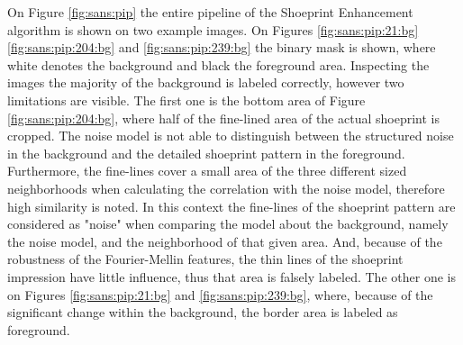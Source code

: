 \documentclass[draft,final]{vutinfth} %
\begin{document}
\par
On Figure \ref{fig:sans:pip} the entire pipeline of the Shoeprint Enhancement algorithm is shown on two example images.
On Figures  \ref{fig:sans:pip:21:bg} \ref{fig:sans:pip:204:bg} and \ref{fig:sans:pip:239:bg} the binary mask is shown, where white denotes the background and black the foreground area.
Inspecting the images the majority of the background is labeled correctly, however two limitations are visible.
The first one is the bottom area of Figure \ref{fig:sans:pip:204:bg}, where half of the fine-lined area of the actual shoeprint is cropped.
The noise model is not able to distinguish between the structured noise in the background and the detailed shoeprint pattern in the foreground.
Furthermore, the fine-lines cover a small area of the three different sized neighborhoods when calculating the correlation with the noise model, therefore high similarity is noted.
In this context the fine-lines of the shoeprint pattern are considered as "noise" when comparing the model about the background, namely the noise model, and the neighborhood of that given area.
And, because of the robustness of the Fourier-Mellin features, the thin lines of the shoeprint impression have little influence, thus that area is falsely labeled.
The other one is on Figures \ref{fig:sans:pip:21:bg} and \ref{fig:sans:pip:239:bg}, where, because of the significant change within the background, the border area is labeled as foreground.
\end{document}
